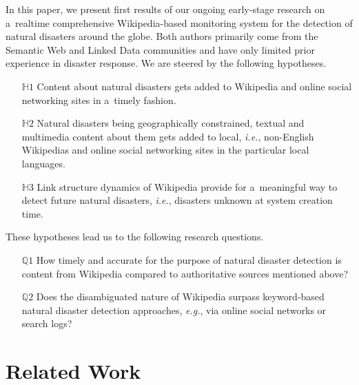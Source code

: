\documentclass[letterpaper]{article}
\begin{document}
In this paper, we present first results of
our ongoing early-stage research
on a~realtime comprehensive Wikipedia-based monitoring system
for the detection of natural disasters around the globe.
Both authors primarily come from the Semantic Web
and Linked Data communities
and have only limited prior experience in disaster response.
We are steered by the following hypotheses.

\begin{itemize}
  \itemsep0em
  \item[$\mathbb{H}1$] Content about natural disasters
    gets added to Wikipedia and online social networking sites in a~timely fashion.
  \item[$\mathbb{H}2$] Natural disasters being geographically
    constrained, textual and multimedia content about them
    gets added to local, \emph{i.e.}, non-English Wikipedias
    and online social networking sites
    in the particular local languages.
  \item[$\mathbb{H}3$] Link structure dynamics of Wikipedia
    provide for a~meaningful way to detect future
    natural disasters, \emph{i.e.}, disasters unknown at system creation time.
\end{itemize}

\pagebreak \noindent These hypotheses lead us to the following research questions.

\begin{itemize}
  \itemsep0em
  \item[$\mathbb{Q}1$] How timely and accurate for the purpose
    of natural disaster detection is content from Wikipedia
    compared to authoritative sources mentioned above?
  \item[$\mathbb{Q}2$] Does the disambiguated nature of Wikipedia
    surpass keyword-based natural disaster detection approaches,
    \emph{e.g.}, via online social networks or search logs?
\end{itemize}

\section{Related Work}
\end{document}
